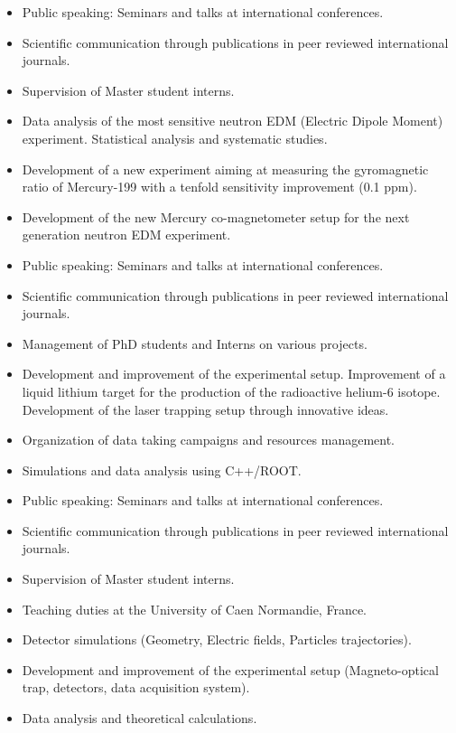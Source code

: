 \documentclass[10pt,a4paper,ragged2e]{altacv}
\begin{document}
\begin{itemize}
\item Public speaking: Seminars and talks at international conferences.
\item Scientific communication through publications in peer reviewed international journals.
\item Supervision of Master student interns.
\item Data analysis of the most sensitive neutron EDM (Electric Dipole Moment) experiment. Statistical analysis and systematic studies.
\item Development of a new experiment aiming at measuring the gyromagnetic ratio of Mercury-199 with a tenfold sensitivity improvement (0.1 ppm).
\item Development of the new Mercury co-magnetometer setup for the next generation neutron EDM experiment.
\end{itemize}

\divider

\begin{itemize}
\item Public speaking: Seminars and talks at international conferences.
\item Scientific communication through publications in peer reviewed international journals.
\item Management of PhD students and Interns on various projects.
\item Development and improvement of the experimental setup. Improvement of a liquid lithium target for the production of the radioactive helium-6 isotope. Development of the laser trapping setup through innovative ideas.
\item Organization of data taking campaigns and resources management.
\item Simulations and data analysis using C++/ROOT.
\end{itemize}

\divider

\begin{itemize}
\item Public speaking: Seminars and talks at international conferences.
\item Scientific communication through publications in peer reviewed international journals.
\item Supervision of Master student interns.
\item Teaching duties at the University of Caen Normandie, France.
\item Detector simulations (Geometry, Electric fields, Particles trajectories).
\item Development and improvement of the experimental setup (Magneto-optical trap, detectors, data acquisition system).
\item Data analysis and theoretical calculations.
\end{itemize}
\end{document}
